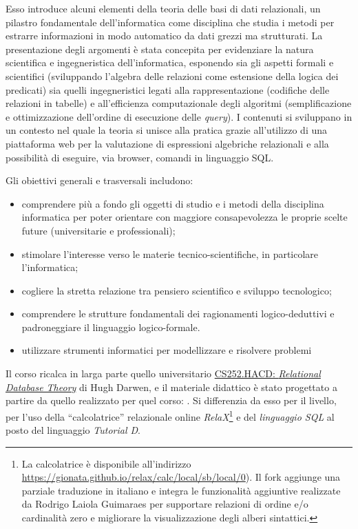 \documentclass[withtimes]{easychair}
\theoremstyle{definition}
\begin{document}
Esso introduce alcuni elementi della teoria delle basi di dati relazionali, un pilastro fondamentale dell'informatica come disciplina che studia i metodi per estrarre informazioni in modo automatico da dati grezzi ma strutturati. La presentazione degli argomenti è stata concepita per evidenziare la natura scientifica e ingegneristica dell'informatica,  esponendo sia gli aspetti formali e scientifici (sviluppando l'algebra delle relazioni come estensione della logica dei predicati) sia quelli ingegneristici legati alla rappresentazione (codifiche delle relazioni in tabelle) e all'efficienza computazionale degli algoritmi (semplificazione e ottimizzazione dell'ordine di esecuzione delle \emph{query}). I contenuti si sviluppano in un contesto nel quale la teoria si unisce alla pratica grazie all'utilizzo di una piattaforma web per la valutazione di espressioni algebriche relazionali e alla possibilità di eseguire, via browser, comandi in linguaggio SQL.

Gli obiettivi generali e trasversali includono:

\begin{itemize}
 \item comprendere più a fondo gli oggetti di studio e i metodi della disciplina informatica per poter orientare con maggiore consapevolezza le proprie scelte future (universitarie e professionali);
 \item stimolare l'interesse verso le materie tecnico-scientifiche, in particolare l'informatica;
 \item cogliere la stretta relazione tra pensiero scientifico e sviluppo tecnologico;
 \item comprendere le strutture fondamentali dei ragionamenti logico-deduttivi
e padroneggiare il linguaggio logico-formale.
 \item utilizzare strumenti informatici per modellizzare e risolvere problemi
\end{itemize}

Il corso ricalca in larga parte quello universitario \href{https://www.dcs.warwick.ac.uk/~hugh/#CS252}{CS252.HACD:
\emph{Relational Database Theory}} di Hugh Darwen, e il  materiale didattico è stato progettato a partire da quello realizzato per quel corso: \cite{darwen2014introduction, darwen2010exercises,darwen2011sql}. Si differenzia da esso per il livello, per l'uso della ``calcolatrice'' relazionale online \emph{RelaX}\footnote{La calcolatrice è disponibile all'indirizzo
\url{https://gionata.github.io/relax/calc/local/sb/local/0}). Il fork aggiunge una parziale traduzione in italiano e integra le funzionalità aggiuntive realizzate da Rodrigo Laiola Guimaraes per supportare relazioni di ordine e/o cardinalità zero e migliorare la visualizzazione degli alberi sintattici.} e del \emph{linguaggio SQL} al posto del linguaggio \emph{Tutorial D}.
\end{document}
